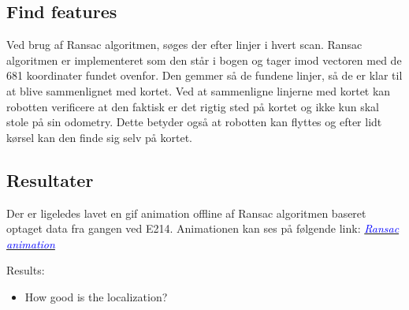 \subsection{Find features}
Ved brug af Ransac algoritmen, søges der efter linjer i hvert scan. Ransac algoritmen er implementeret som den står i bogen og tager imod vectoren med de 681 koordinater fundet ovenfor. Den gemmer så de fundene linjer, så de er klar til at blive sammenlignet med kortet. Ved at sammenligne linjerne med kortet kan robotten verificere at den faktisk er det rigtig sted på kortet og ikke kun skal stole på sin odometry. Dette betyder også at robotten kan flyttes og efter lidt kørsel kan den finde sig selv på kortet.

\subsection{Resultater}
Der er ligeledes lavet en gif animation offline af Ransac algoritmen baseret optaget data fra gangen ved E214. Animationen kan ses på følgende link: \href{https://www.dropbox.com/s/5u5d27s73241f2i/ransac.gif?n=110116599}{\textcolor{blue}{\textit{Ransac animation}}}

Results:
\begin{itemize}
\item How good is the localization?
\end{itemize}
